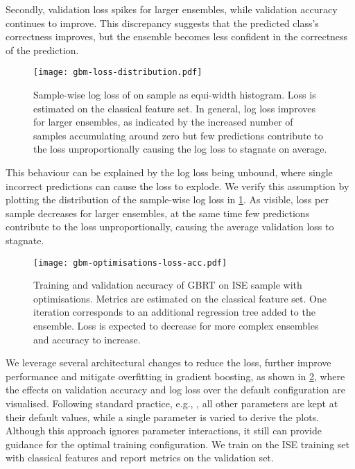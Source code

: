 Secondly, validation loss spikes for larger ensembles, while validation accuracy continues to improve. This discrepancy suggests that the predicted class's correctness improves, but the ensemble becomes less confident in the correctness of the prediction. 

\begin{figure}[ht]
    \centering
    \texttt{[image: gbm-loss-distribution.pdf]}
    \caption[Sample-Wise Log Loss of  on  Sample]{Sample-wise log loss of  on  sample as equi-width histogram. Loss is estimated on the classical feature set. In general, log loss improves for larger ensembles, as indicated by the increased number of samples accumulating around zero but few predictions contribute to the loss unproportionally causing the log loss to stagnate on average.}
    \label{fig:gbm-loss-distribution}
\end{figure}

This behaviour can be explained by the log loss being unbound, where single incorrect predictions can cause the loss to explode. We verify this assumption by plotting the distribution of the sample-wise log loss in \cref{fig:gbm-loss-distribution}. As visible, loss per sample decreases for larger ensembles, at the same time few predictions contribute to the loss unproportionally, causing the average validation loss to stagnate.

\begin{figure}[ht]
    \centering
    \texttt{[image: gbm-optimisations-loss-acc.pdf]}
    \caption[Training and Validation Accuracy of  on  with Optimisations]{Training and validation accuracy of \gls{GBRT} on \gls{ISE} sample with optimisations. Metrics are estimated on the classical feature set. One iteration corresponds to an additional regression tree added to the ensemble. Loss is expected to decrease for more complex ensembles and accuracy to increase.}
    \label{fig:gbm-optimisations-loss-acc}
\end{figure}

We leverage several architectural changes to reduce the loss, further improve performance and mitigate overfitting in gradient boosting, as shown in \cref{fig:gbm-optimisations-loss-acc}, where the effects on validation accuracy and log loss over the default configuration are visualised. Following standard practice, e.g., \textcite{tuningplaybookgithub}, all other parameters are kept at their default values, while a single parameter is varied to derive the plots. Although this approach ignores parameter interactions, it still can provide guidance for the optimal training configuration. We train on the ISE training set with classical features and report metrics on the validation set.

